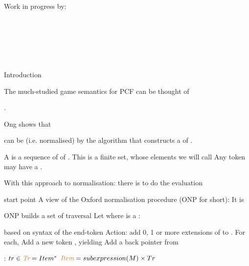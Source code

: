 \documentclass[12pt,fleqn,landscape]{article}
\begin{document}
\begin{center}\LARGE

Work in progress by:
\vair

\bi
\item 
 \\\hair
{}\\
\vair\vair

\item 
 \\\hair
{}\\
\ei
\end{center}


\begin{slide}{Introduction}

The much-studied game semantics for PCF can be thought of

.

\bc
Ong \cite{ong2015} shows that
\ec

 can be  (i.e. normalised) by the algorithm that constructs a  of .
\vair\vair

A  is a sequence of
\bi
\ii  {} of .
  This is a finite set, whose elements we will call 
  \hfill {}
\vair
\ii Any token may have a .
\ei

\vair\vair

With this approach to normalisation: there is  to do the evaluation
\vair\vair

\end{slide}



\begin{slide}{start point}
\bi
\ii A view of the Oxford normalisation procedure (ONP for short): It is
\vair

\bc{}
\ec

\ii ONP builds a set of traversal 
\bi
\ii Let  \hfill where  is a 
\vair
\ii {}:

  \hfill based on syntax of the end-token 
\vair
\ii Action: add 0, 1 or more extensions of  to . For each,
\vair
    \bi
    \ii Add a new token , yielding 
    \ii Add a back pointer from 
    \ei
\ei
\vair

:
\bi
\ii $tr \in {\color{brown}\textit{\boldmath{Tr}}} = Item^{*}$
\ii ${\color{brown}\textit{\boldmath{Item}}} = subexpression(M) \times Tr$
\ei
\ei

\end{slide}
\end{document}
